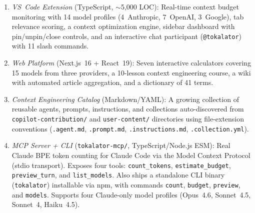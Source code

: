 \documentclass[a4paper,fleqn]{cas-dc}
\begin{document}
\begin{enumerate}
  \item \textit{VS~Code Extension} (TypeScript, $\sim$5,000 LOC): Real-time context budget monitoring with 14 model profiles (4~Anthropic, 7~OpenAI, 3~Google), tab relevance scoring, a context optimization engine, sidebar dashboard with pin/unpin/close controls, and an interactive chat participant (\texttt{@tokalator}) with 11 slash commands.
 
  \item \textit{Web Platform} (Next.js~16 + React~19): Seven interactive calculators covering 15 models from three providers, a 10-lesson context engineering course, a wiki with automated article aggregation, and a dictionary of 41 terms.

  \item \textit{Context Engineering Catalog} (Markdown/YAML): A growing collection of reusable agents, prompts, instructions, and collections auto-discovered from \texttt{copilot-contribution/} and \texttt{user-content/} directories using file-extension conventions (\texttt{.agent.md}, \texttt{.prompt.md}, \texttt{.instructions.md}, \texttt{.collection.yml}).

  \item \textit{MCP Server + CLI} (\texttt{tokalator-mcp/}, TypeScript/Node.js ESM): Real Claude BPE token counting for Claude Code via the Model Context Protocol (stdio transport). Exposes four tools: \texttt{count\_tokens}, \texttt{estimate\_budget}, \texttt{preview\_turn}, and \texttt{list\_models}. Also ships a standalone CLI binary (\texttt{tokalator}) installable via npm, with commands \texttt{count}, \texttt{budget}, \texttt{preview}, and \texttt{models}. Supports four Claude-only model profiles (Opus~4.6, Sonnet~4.5, Sonnet~4, Haiku~4.5).
  
\end{enumerate}
\end{document}
